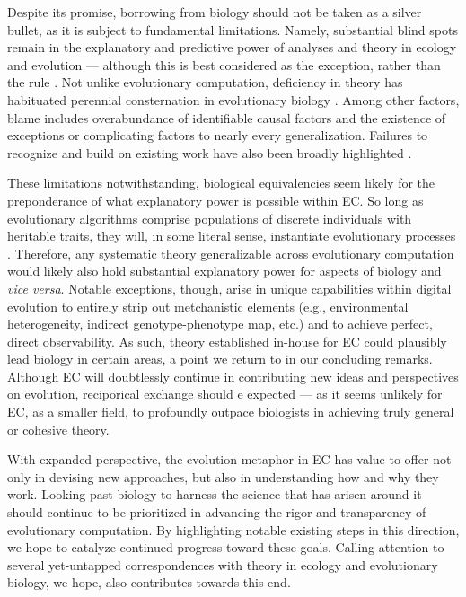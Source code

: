 


Despite its promise, borrowing from biology should not be taken as a silver bullet, as it is subject to fundamental limitations.
Namely, substantial blind spots remain in the explanatory and predictive power of analyses and theory in ecology and evolution \citep{houlahan2016priority,catford2022addressing,yates2018outstanding} --- although this is best considered as the exception, rather than the rule \citep{lynch2025complexity}.
Not unlike evolutionary computation, deficiency in theory has habituated perennial consternation in evolutionary biology \citep{welch2017wrong}.
Among other factors, blame includes overabundance of identifiable causal factors and the existence of exceptions or complicating factors to nearly every generalization.
Failures to recognize and build on existing work have also been broadly highlighted \citep{lynch2025complexity,beer2024alife}.

These limitations notwithstanding, biological equivalencies seem likely for the preponderance of what explanatory power is possible within EC.
So long as evolutionary algorithms comprise populations of discrete individuals with heritable traits, they will, in some literal sense, instantiate evolutionary processes \citep{pennock2007models}.
Therefore, any systematic theory generalizable across evolutionary computation would likely also hold substantial explanatory power for aspects of biology and \textit{vice versa}.
Notable exceptions, though, arise in unique capabilities within digital evolution to entirely strip out metchanistic elements (e.g., environmental heterogeneity, indirect genotype-phenotype map, etc.) and to achieve perfect, direct observability.
As such, theory established in-house for EC could plausibly lead biology in certain areas, a point we return to in our concluding remarks.
Although EC will doubtlessly continue in contributing new ideas and perspectives on evolution, reciporical exchange should e expected --- as it seems unlikely for EC, as a smaller field, to profoundly outpace biologists in achieving truly general or cohesive theory.

With expanded perspective, the evolution metaphor in EC has value to offer not only in devising new approaches, but also in understanding how and why they work.
Looking past biology to harness the science that has arisen around it should continue to be prioritized in advancing the rigor and transparency of evolutionary computation.
By highlighting notable existing steps in this direction, we hope to catalyze continued progress toward these goals.
Calling attention to several yet-untapped correspondences with theory in ecology and evolutionary biology, we hope, also contributes towards this end.
